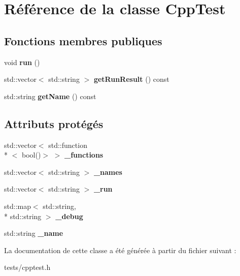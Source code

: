\hypertarget{class_cpp_test}{\section{Référence de la classe Cpp\+Test}
\label{class_cpp_test}
}
\subsection*{Fonctions membres publiques}
\begin{DoxyCompactItemize}
\item 
\hypertarget{class_cpp_test_a8aff5751222f5628b22f7cf779084ad3}{void {\bfseries run} ()}\label{class_cpp_test_a8aff5751222f5628b22f7cf779084ad3}

\item 
\hypertarget{class_cpp_test_aedd6614f9b210d010ca1baeaca980fa3}{std\+::vector$<$ std\+::string $>$ {\bfseries get\+Run\+Result} () const }\label{class_cpp_test_aedd6614f9b210d010ca1baeaca980fa3}

\item 
\hypertarget{class_cpp_test_a624326be39d7bf7c82958a09a31baf59}{std\+::string {\bfseries get\+Name} () const }\label{class_cpp_test_a624326be39d7bf7c82958a09a31baf59}

\end{DoxyCompactItemize}
\subsection*{Attributs protégés}
\begin{DoxyCompactItemize}
\item 
\hypertarget{class_cpp_test_a6f84ce3b15e84c1cff58182542cea6e6}{std\+::vector$<$ std\+::function\\*
$<$ bool()$>$ $>$ {\bfseries \+\_\+functions}}\label{class_cpp_test_a6f84ce3b15e84c1cff58182542cea6e6}

\item 
\hypertarget{class_cpp_test_afeb2fdc9c03b0355d4c086635606d513}{std\+::vector$<$ std\+::string $>$ {\bfseries \+\_\+names}}\label{class_cpp_test_afeb2fdc9c03b0355d4c086635606d513}

\item 
\hypertarget{class_cpp_test_a03b7bc0f40d071e56e1f118a1e20d7e1}{std\+::vector$<$ std\+::string $>$ {\bfseries \+\_\+run}}\label{class_cpp_test_a03b7bc0f40d071e56e1f118a1e20d7e1}

\item 
\hypertarget{class_cpp_test_a41eec7fef4f6e4826bca3cc2a07e28a9}{std\+::map$<$ std\+::string, \\*
std\+::string $>$ {\bfseries \+\_\+debug}}\label{class_cpp_test_a41eec7fef4f6e4826bca3cc2a07e28a9}

\item 
\hypertarget{class_cpp_test_a518d58b502a05aded3dab21f705bfbd4}{std\+::string {\bfseries \+\_\+name}}\label{class_cpp_test_a518d58b502a05aded3dab21f705bfbd4}

\end{DoxyCompactItemize}


La documentation de cette classe a été générée à partir du fichier suivant \+:\begin{DoxyCompactItemize}
\item 
tests/cpptest.\+h\end{DoxyCompactItemize}
